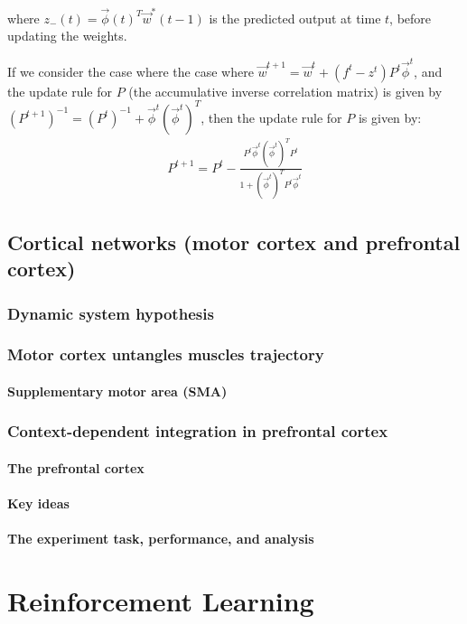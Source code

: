 \documentclass[11pt]{book} %
\begin{document}
where $z_{-} (t) = \vec{\phi}(t)^T \vec{w}^*(t-1)$ is the predicted output at time $t$, before updating the weights.

If we consider the case where the case where $\vec{w}^{t+1} = \vec{w}^t + (f^t - z^t) P^t \vec{\phi}^t $, 
and the update rule for $P$ (the accumulative inverse correlation matrix) is given by $(P^{t+1})^{-1} = (P^t)^{-1}  + \vec{\phi}^t (\vec{\phi}^{t})^T$,
then the update rule for $P$ is given by:
\begin{align*}
    P^{t+1} = P^t - \frac{P^t \vec{\phi}^t (\vec{\phi}^t)^T P^t}{1 + (\vec{\phi}^t)^T P^t \vec{\phi}^t}
\end{align*}

%
%
%

\section{Cortical networks (motor cortex and prefrontal cortex)}
\subsection{Dynamic system hypothesis}
\subsection{Motor cortex untangles muscles trajectory}
\subsubsection{Supplementary motor area (SMA)}
\subsection{Context-dependent integration in prefrontal cortex}
\subsubsection{The prefrontal cortex}
\subsubsection{Key ideas}
\subsubsection{The experiment task, performance, and analysis}

%
%
%
%
%
%
%
%
%
%
%
%
%
%
%
%


\chapter{Reinforcement Learning}
\end{document}
